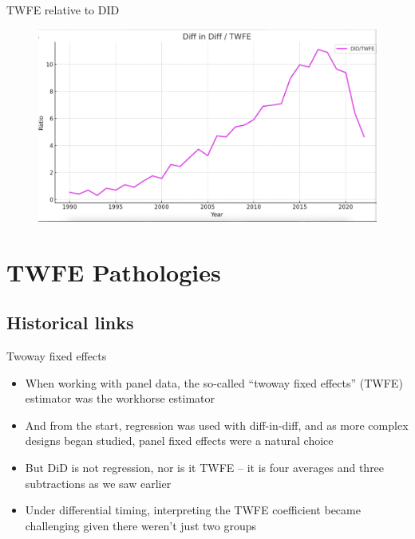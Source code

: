 \documentclass{beamer}
\begin{document}
\begin{frame}{TWFE relative to DID}

	\begin{figure}
	\includegraphics[scale=0.15]{./lecture_includes/wave4}
	\end{figure}

\end{frame}







\section{TWFE Pathologies}

\subsection{Historical links}




\begin{frame}{Twoway fixed effects}

\begin{itemize}
\item When working with panel data, the so-called ``twoway fixed effects'' (TWFE) estimator was the workhorse estimator
\item And from the start, regression was used with diff-in-diff, and as more complex designs began studied, panel fixed effects were a natural choice
\item But DiD is not regression, nor is it TWFE -- it is four averages and three subtractions as we saw earlier
\item Under differential timing, interpreting the TWFE coefficient became challenging given there weren't just two groups
\end{itemize}

\end{frame}
\end{document}
